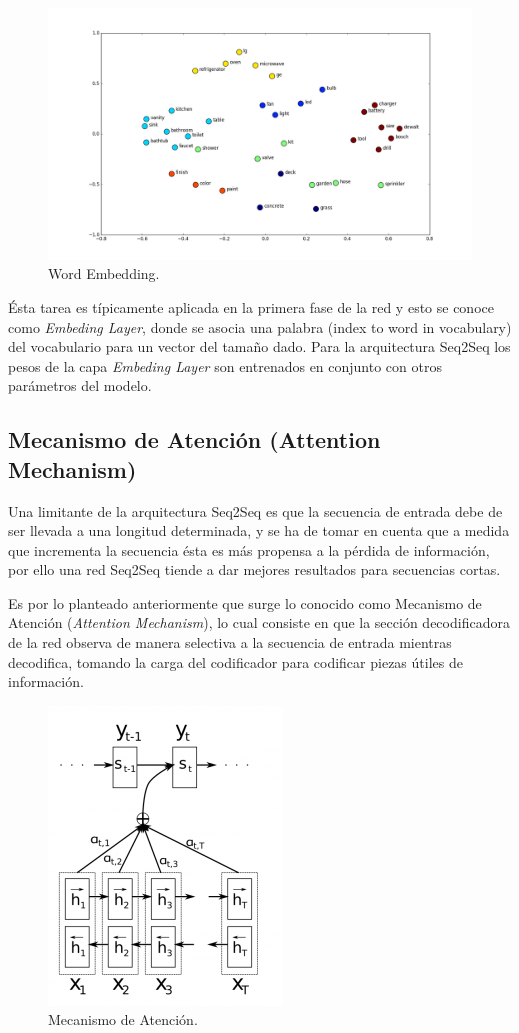 \documentclass[12pt, letterpaper]{article}
\begin{document}
    \begin{figure}[H]
        \centering
        \includegraphics[width=\linewidth]{img/we1.png}
        \caption{Word Embedding.}
    \end{figure}

    Ésta tarea es típicamente aplicada en la primera fase de la red y esto se conoce como \emph{Embeding Layer}, donde se asocia una palabra (index to word in vocabulary) del vocabulario para un vector del tamaño dado. Para la arquitectura Seq2Seq los pesos de la capa \emph{Embeding Layer} son entrenados en conjunto con otros parámetros del modelo\cite{Ramamoorthy}.

    \subsection{Mecanismo de Atención (Attention Mechanism)}
    Una limitante de la arquitectura Seq2Seq es que la secuencia de entrada debe de ser llevada a una longitud determinada, y se ha de tomar en cuenta que a medida que incrementa la secuencia ésta es más propensa a la pérdida de información, por ello una red Seq2Seq tiende a dar mejores resultados para secuencias cortas.

    Es por lo planteado anteriormente que surge lo conocido como Mecanismo de Atención (\emph{Attention Mechanism})\cite{bahdanau2014neural}, lo cual consiste en que la sección decodificadora de la red observa de manera selectiva a la secuencia de entrada mientras decodifica, tomando la carga del codificador para codificar piezas útiles de información.

    \begin{figure}[H]
        \centering
        \includegraphics[width=0.4\linewidth]{img/attention1.png}
        \caption{Mecanismo de Atención.}
    \end{figure}
\end{document}
